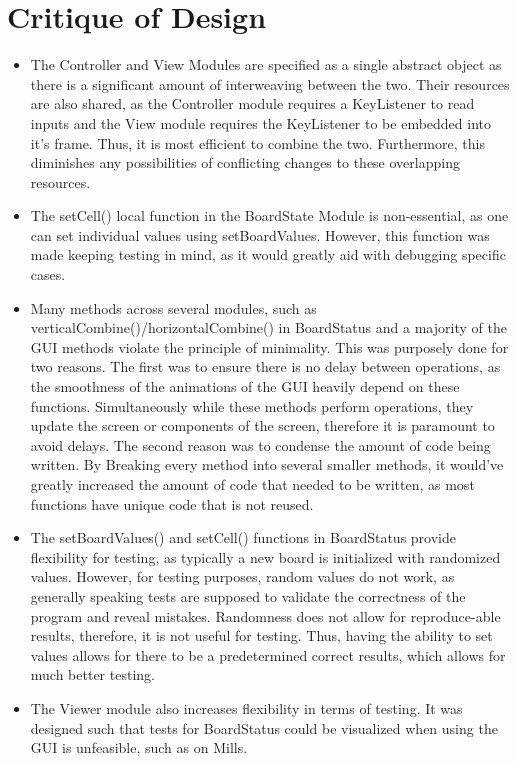 \documentclass{article}
\begin{document}
\section*{Critique of Design}
\begin{itemize}
    \item The Controller and View Modules are specified as a single abstract object as there is a significant amount of interweaving between the two. Their resources are also shared, as the Controller module requires a KeyListener to read inputs and the View module requires the KeyListener to be embedded into it's frame. Thus, it is most efficient to combine the two. Furthermore, this diminishes any possibilities of conflicting changes to these overlapping resources.
    \item The setCell() local function in the BoardState Module is non-essential, as one can set individual values using setBoardValues. However, this function was made keeping testing in mind, as it would greatly aid with debugging specific cases.
    \item Many methods across several modules, such as verticalCombine()/horizontalCombine() in BoardStatus and a majority of the GUI methods violate the principle of minimality. This was purposely done for two reasons. The first was to ensure there is no delay between operations, as the smoothness of the animations of the GUI heavily depend on these functions. Simultaneously while these methods perform operations, they update the screen or components of the screen, therefore it is paramount to avoid delays. The second reason was to condense the amount of code being written. By Breaking every method into several smaller methods, it would've greatly increased the amount of code that needed to be written, as most functions have unique code that is not reused.
    \item The setBoardValues() and setCell() functions in BoardStatus provide flexibility for testing, as typically a new board is initialized with randomized values. However, for testing purposes, random values do not work, as generally speaking tests are supposed to validate the correctness of the program and reveal mistakes. Randomness does not allow for reproduce-able results, therefore, it is not useful for testing. Thus, having the ability to set values allows for there to be a predetermined correct results, which allows for much better testing. 
    \item The Viewer module also increases flexibility in terms of testing. It was designed such that tests for BoardStatus could be visualized when using the GUI is unfeasible, such as on Mills.

\end{itemize}
\end{document}
